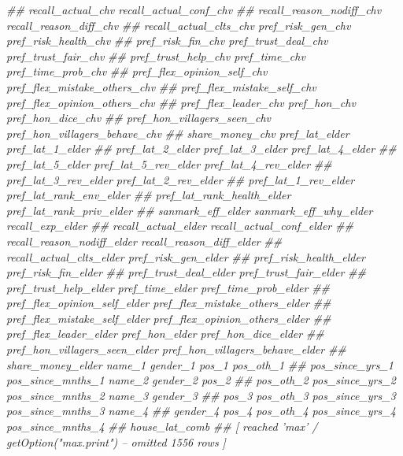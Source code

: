 \documentclass[
]{article}
\newenvironment{Shaded}{\begin{snugshade}}{\end{snugshade}}
\newcommand{\CommentTok}[1]{\textcolor[rgb]{0.56,0.35,0.01}{\textit{#1}}}
\begin{document}
\begin{Shaded}
\begin{Highlighting}[]
\CommentTok{##      recall_actual_chv recall_actual_conf_chv}
\CommentTok{##      recall_reason_nodiff_chv recall_reason_diff_chv}
\CommentTok{##      recall_actual_clts_chv pref_risk_gen_chv pref_risk_health_chv}
\CommentTok{##      pref_risk_fin_chv pref_trust_deal_chv pref_trust_fair_chv}
\CommentTok{##      pref_trust_help_chv pref_time_chv pref_time_prob_chv}
\CommentTok{##      pref_flex_opinion_self_chv pref_flex_mistake_others_chv}
\CommentTok{##      pref_flex_mistake_self_chv pref_flex_opinion_others_chv}
\CommentTok{##      pref_flex_leader_chv pref_hon_chv pref_hon_dice_chv}
\CommentTok{##      pref_hon_villagers_seen_chv pref_hon_villagers_behave_chv}
\CommentTok{##      share_money_chv pref_lat_elder pref_lat_1_elder}
\CommentTok{##      pref_lat_2_elder pref_lat_3_elder pref_lat_4_elder}
\CommentTok{##      pref_lat_5_elder pref_lat_5_rev_elder pref_lat_4_rev_elder}
\CommentTok{##      pref_lat_3_rev_elder pref_lat_2_rev_elder}
\CommentTok{##      pref_lat_1_rev_elder pref_lat_rank_env_elder}
\CommentTok{##      pref_lat_rank_health_elder pref_lat_rank_priv_elder}
\CommentTok{##      sanmark_eff_elder sanmark_eff_why_elder recall_exp_elder}
\CommentTok{##      recall_actual_elder recall_actual_conf_elder}
\CommentTok{##      recall_reason_nodiff_elder recall_reason_diff_elder}
\CommentTok{##      recall_actual_clts_elder pref_risk_gen_elder}
\CommentTok{##      pref_risk_health_elder pref_risk_fin_elder}
\CommentTok{##      pref_trust_deal_elder pref_trust_fair_elder}
\CommentTok{##      pref_trust_help_elder pref_time_elder pref_time_prob_elder}
\CommentTok{##      pref_flex_opinion_self_elder pref_flex_mistake_others_elder}
\CommentTok{##      pref_flex_mistake_self_elder pref_flex_opinion_others_elder}
\CommentTok{##      pref_flex_leader_elder pref_hon_elder pref_hon_dice_elder}
\CommentTok{##      pref_hon_villagers_seen_elder pref_hon_villagers_behave_elder}
\CommentTok{##      share_money_elder name_1 gender_1 pos_1 pos_oth_1}
\CommentTok{##      pos_since_yrs_1 pos_since_mnths_1 name_2 gender_2 pos_2}
\CommentTok{##      pos_oth_2 pos_since_yrs_2 pos_since_mnths_2 name_3 gender_3}
\CommentTok{##      pos_3 pos_oth_3 pos_since_yrs_3 pos_since_mnths_3 name_4}
\CommentTok{##      gender_4 pos_4 pos_oth_4 pos_since_yrs_4 pos_since_mnths_4}
\CommentTok{##      house_lat_comb}
\CommentTok{##  [ reached 'max' / getOption("max.print") -- omitted 1556 rows ]}


\end{Highlighting}
\end{Shaded}
\end{document}

